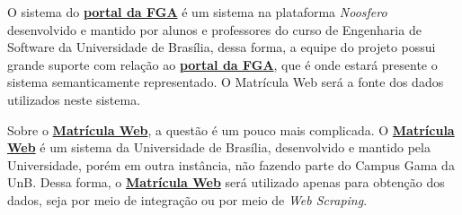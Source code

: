 
O sistema do \href{https://fga.unb.br/}{\textbf{portal da FGA}} é um sistema na plataforma \textit{Noosfero} desenvolvido e mantido por alunos e professores do curso de Engenharia de Software da Universidade de Brasília, dessa forma, a equipe do projeto possui grande suporte com relação ao \href{https://fga.unb.br/}{\textbf{portal da FGA}}, que é onde estará presente o sistema semanticamente representado. O Matrícula Web será a fonte dos dados utilizados neste sistema.

Sobre o \href{http://matriculaweb.unb.br}{\textbf{Matrícula Web}}, a questão é um pouco mais complicada. O \href{http://matriculaweb.unb.br}{\textbf{Matrícula Web}} é um sistema da Universidade de Brasília, desenvolvido e mantido pela Universidade, porém em outra instância, não fazendo parte do Campus Gama da UnB. Dessa forma, o \href{http://matriculaweb.unb.br}{\textbf{Matrícula Web}} será utilizado apenas para obtenção dos dados, seja por meio de integração ou por meio de \textit{Web Scraping}.
